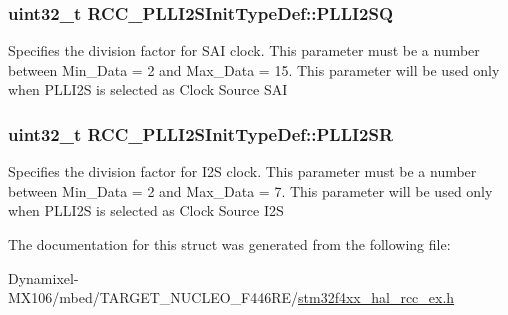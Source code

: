 \subsubsection[{\texorpdfstring{P\+L\+L\+I2\+SQ}{PLLI2SQ}}]{\setlength{\rightskip}{0pt plus 5cm}uint32\+\_\+t R\+C\+C\+\_\+\+P\+L\+L\+I2\+S\+Init\+Type\+Def\+::\+P\+L\+L\+I2\+SQ}\hypertarget{struct_r_c_c___p_l_l_i2_s_init_type_def_a158ad7609d011d8f976556479cccb646}{}\label{struct_r_c_c___p_l_l_i2_s_init_type_def_a158ad7609d011d8f976556479cccb646}
Specifies the division factor for S\+AI clock. This parameter must be a number between Min\+\_\+\+Data = 2 and Max\+\_\+\+Data = 15. This parameter will be used only when P\+L\+L\+I2S is selected as Clock Source S\+AI 
\subsubsection[{\texorpdfstring{P\+L\+L\+I2\+SR}{PLLI2SR}}]{\setlength{\rightskip}{0pt plus 5cm}uint32\+\_\+t R\+C\+C\+\_\+\+P\+L\+L\+I2\+S\+Init\+Type\+Def\+::\+P\+L\+L\+I2\+SR}\hypertarget{struct_r_c_c___p_l_l_i2_s_init_type_def_ad49056bf464bd58c0c0692c36b70b473}{}\label{struct_r_c_c___p_l_l_i2_s_init_type_def_ad49056bf464bd58c0c0692c36b70b473}
Specifies the division factor for I2S clock. This parameter must be a number between Min\+\_\+\+Data = 2 and Max\+\_\+\+Data = 7. This parameter will be used only when P\+L\+L\+I2S is selected as Clock Source I2S 

The documentation for this struct was generated from the following file\+:\begin{DoxyCompactItemize}
\item 
Dynamixel-\/\+M\+X106/mbed/\+T\+A\+R\+G\+E\+T\+\_\+\+N\+U\+C\+L\+E\+O\+\_\+\+F446\+R\+E/\hyperlink{stm32f4xx__hal__rcc__ex_8h}{stm32f4xx\+\_\+hal\+\_\+rcc\+\_\+ex.\+h}\end{DoxyCompactItemize}
